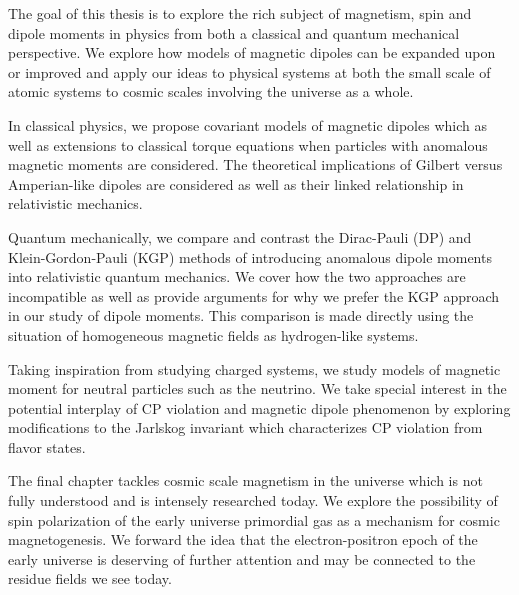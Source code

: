 

The goal of this thesis is to explore the rich subject of magnetism, spin and dipole moments in physics from both a classical and quantum mechanical perspective. We explore how models of magnetic dipoles can be expanded upon or improved and apply our ideas to physical systems at both the small scale of atomic systems to cosmic scales involving the universe as a whole.

In classical physics, we propose covariant models of magnetic dipoles which as well as extensions to classical torque equations when particles with anomalous magnetic moments are considered. The theoretical implications of Gilbert versus Amperian-like dipoles are considered as well as their linked relationship in relativistic mechanics.

Quantum mechanically, we compare and contrast the Dirac-Pauli (DP) and Klein-Gordon-Pauli (KGP) methods of introducing anomalous dipole moments into relativistic quantum mechanics. We cover how the two approaches are incompatible as well as provide arguments for why we prefer the KGP approach in our study of dipole moments. This comparison is made directly using the situation of homogeneous magnetic fields as hydrogen-like systems.

Taking inspiration from studying charged systems, we study models of magnetic moment for neutral particles such as the neutrino. We take special interest in the potential interplay of CP violation and magnetic dipole phenomenon by exploring modifications to the Jarlskog invariant which characterizes CP violation from flavor states.

The final chapter tackles cosmic scale magnetism in the universe which is not fully understood and is intensely researched today. We explore the possibility of spin polarization of the early universe primordial gas as a mechanism for cosmic magnetogenesis. We forward the idea that the electron-positron epoch of the early universe is deserving of further attention and may be connected to the residue fields we see today.


